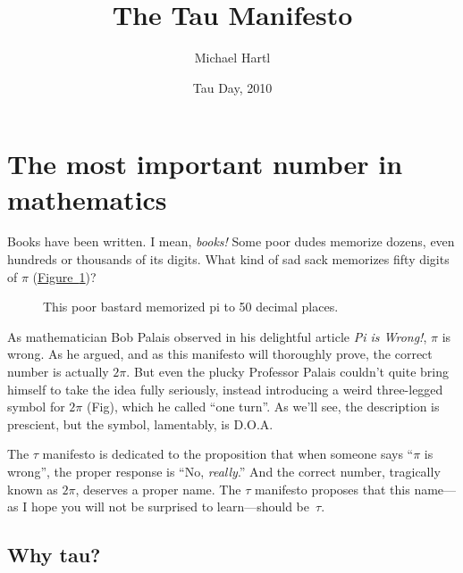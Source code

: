 \documentclass{article}
\begin{document}
\title{The Tau Manifesto}
\author{Michael Hartl}
\date{Tau Day, 2010}
\maketitle

\section{The most important number in mathematics} %
\label{sec:the_most_important_number_in_mathematics}

Books have been written. I mean, \emph{books!} Some poor dudes memorize dozens, even hundreds or thousands of its digits. What kind of sad sack memorizes fifty digits of $\pi$ (\hyperref[fig:michael_hartl]{Figure~}\ref{fig:michael_hartl})?

\begin{figure}
\begin{center}
\end{center}
\caption{This poor bastard memorized pi to 50 decimal places.\label{fig:michael_hartl}}
\end{figure}

As mathematician Bob Palais observed in his delightful article \emph{Pi is Wrong!}, $\pi$ is wrong. As he argued, and as this manifesto will thoroughly prove, the correct number is actually $2\pi$. But even the plucky Professor Palais couldn't quite bring himself to take the idea fully seriously, instead introducing a weird three-legged symbol for $2\pi$ (Fig), which he called ``one turn''. As we'll see, the description is prescient, but the symbol, lamentably, is D.O.A. 

The $\tau$ manifesto is dedicated to the proposition that when someone says ``$\pi$ is wrong'', the proper response is ``No, \emph{really}.'' And the correct number, tragically known as $2\pi$, deserves a proper name. The $\tau$ manifesto proposes that this name---as I hope you will not be surprised to learn---should be~$\tau$.

  \subsection{Why tau?} %
  \label{sec:why_tau}
  
\end{document}
